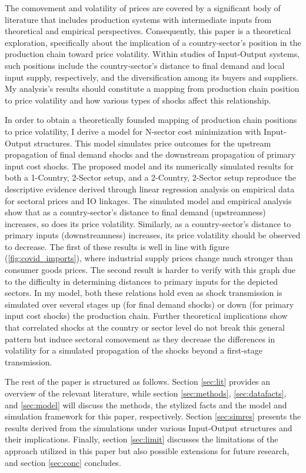 The comovement and volatility of prices are covered by a significant body of literature that includes production systems with intermediate 
inputs from theoretical and empirical perspectives. Consequently, this paper is a theoretical exploration, specifically about the implication 
of a country-sector's position in the production chain toward price volatility. Within studies of Input-Output systems, such positions 
include the country-sector's distance to final demand and local input supply, respectively, and the diversification among its buyers and 
suppliers. My analysis's results should constitute a mapping from production chain position to price volatility and how various types of 
shocks affect this relationship.

In order to obtain a theoretically founded mapping of production chain positions to price volatility, I derive a model for N-sector cost 
minimization with Input-Output structures. This model simulates price outcomes for the upstream propagation of final demand shocks   
and the downstream propagation of primary input cost shocks. The proposed model and its numerically simulated results for both a 
1-Country, 2-Sector setup, and a 2-Country, 2-Sector setup reproduce the descriptive evidence derived through linear regression analysis
on empirical data for sectoral prices and IO linkages. The simulated model and empirical analysis show that as a country-sector's distance 
to final demand (upstreamness) increases, so does its price volatility. Similarly, as a country-sector's distance to primary inputs 
(downstreamness) increases, its price volatility should be observed to decrease. The first of these results is well in line with figure 
(\ref{fig:covid_imports}), where industrial supply prices change much stronger than consumer goods prices. The second result is harder to 
verify with this graph due to the difficulty in determining distances to primary inputs for the depicted sectors. In my model, both 
these relations hold even as shock transmission is simulated over several stages up (for final demand shocks) or down (for primary 
input cost shocks) the production chain. Further theoretical implications show that correlated shocks at the country or sector level 
do not break this general pattern but induce sectoral comovement as they decrease the differences in volatility for a simulated 
propagation of the shocks beyond a first-stage transmission.

The rest of the paper is structured as follows. Section \ref{sec:lit} provides an overview of the relevant literature, while section 
\ref{sec:methods}, \ref{sec:datafacts}, and \ref{sec:model} will discuss the methods, the stylized facts and the model and simulation 
framework for this paper, respectively. Section \ref{sec:simres} presents the results derived from the simulations under various 
Input-Output structures and their implications. Finally, section \ref{sec:limit} discusses the limitations of the approach utilized in 
this paper but also possible extensions for future research, and section \ref{sec:conc} concludes.

